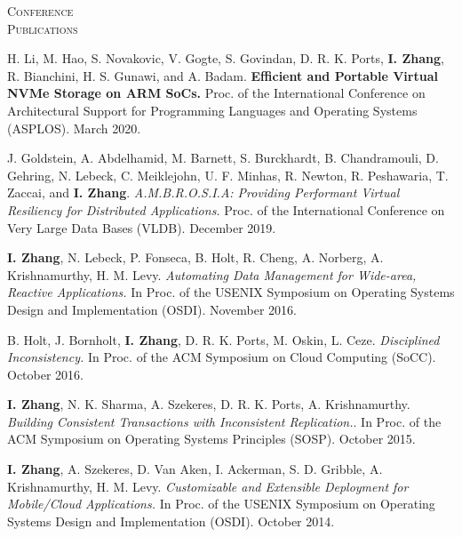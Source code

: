 \documentclass[10pt,times]{report}
\newlength{\sectiongap}
\newlength{\sectioncolwidth}
\newlength{\colgap}
\newlength{\stuffwidth}
\newenvironment{rtable}{
  \begin{minipage}{\textwidth}
  }{
  \end{minipage}
}
\newenvironment{rsection}[1]{
  \begin{minipage}[t]{\sectioncolwidth}
    \textsc{#1}
  \end{minipage}
  \hspace{\colgap}
  \begin{minipage}[t]{\stuffwidth}
  }{
    \removelastskip
  \end{minipage}
  \\[\sectiongap]
}
\begin{document}
\begin{rtable}
\begin{rsection}{Conference\\Publications}
    H. Li, M. Hao, S. Novakovic, V. Gogte, S. Govindan,
    D. R. K. Ports, \textbf{I. Zhang}, R. Bianchini, H. S. Gunawi, and
    A. Badam. \textbf{ Efficient and Portable Virtual NVMe Storage on
      ARM SoCs.}  Proc. of the International Conference on
    Architectural Support for Programming Languages and Operating
    Systems (ASPLOS). March 2020.\\\vspace{-0.5em}
    
    J. Goldstein, A. Abdelhamid, M. Barnett, S. Burckhardt,
    B. Chandramouli, D. Gehring, N. Lebeck, C.  Meiklejohn,
    U. F. Minhas, R. Newton, R. Peshawaria, T.  Zaccai, and
    \textbf{I. Zhang}.  \textit{ A.M.B.R.O.S.I.A: Providing Performant
      Virtual Resiliency for Distributed Applications.} Proc. of
    the International Conference on Very Large Data Bases (VLDB).
    December 2019. \\\vspace{-0.5em}

    \textbf{I. Zhang}, N. Lebeck, P. Fonseca, B. Holt, R. Cheng,
    A. Norberg, A. Krishnamurthy, H.  M. Levy. \textit{Automating Data
      Management for Wide-area, Reactive Applications.}  In
    Proc. of the USENIX Symposium on Operating Systems Design
    and Implementation (OSDI). November 2016.\\\vspace{-0.5em}

    B. Holt, J. Bornholt, \textbf{I. Zhang}, D. R. K. Ports, M.
    Oskin, L. Ceze. \textit{Disciplined Inconsistency.}  In
    Proc. of the ACM Symposium on Cloud Computing (SoCC).
    October 2016.\\\vspace{-0.5em}

    \textbf{I. Zhang}, N. K. Sharma, A. Szekeres, D. R. K. Ports,
    A. Krishnamurthy. \textit{Building Consistent Transactions with
      Inconsistent Replication.}.  In Proc. of the ACM Symposium
    on Operating Systems Principles (SOSP).  October
    2015.\\\vspace{-0.5em}

    \textbf{I. Zhang}, A. Szekeres, D. Van Aken, I. Ackerman,
    S. D. Gribble, A. Krishnamurthy, H. M. Levy. \textit{Customizable
      and Extensible Deployment for Mobile/Cloud Applications.}  In
    Proc. of the USENIX Symposium on Operating Systems Design
    and
    Implementation (OSDI).  October 2014.\\
    \vspace{-0.5em}


\end{rsection}
\end{rtable}
\end{document}
